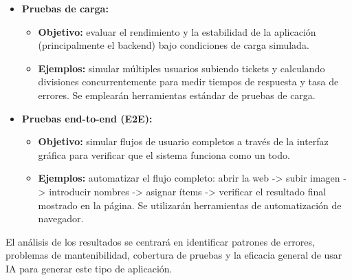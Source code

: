 \documentclass[a4paper, 11pt]{article}
\begin{document}
\begin{itemize}
\begin{itemize}
        \end{itemize}
    \item \textbf{Pruebas de carga:}
        \begin{itemize}
            \item \textbf{Objetivo:} evaluar el rendimiento y la estabilidad de la aplicación (principalmente el backend) bajo condiciones de carga simulada.
            \item \textbf{Ejemplos:} simular múltiples usuarios subiendo tickets y calculando divisiones concurrentemente para medir tiempos de respuesta y tasa de errores. Se emplearán herramientas estándar de pruebas de carga.
        \end{itemize}
    \item \textbf{Pruebas end-to-end (E2E):}
        \begin{itemize}
            \item \textbf{Objetivo:} simular flujos de usuario completos a través de la interfaz gráfica para verificar que el sistema funciona como un todo.
            \item \textbf{Ejemplos:} automatizar el flujo completo: abrir la web -> subir imagen -> introducir nombres -> asignar ítems -> verificar el resultado final mostrado en la página. Se utilizarán herramientas de automatización de navegador.
        \end{itemize}
\end{itemize}
El análisis de los resultados se centrará en identificar patrones de errores, problemas de mantenibilidad, cobertura de pruebas y la eficacia general de usar IA para generar este tipo de aplicación.

\end{document}
